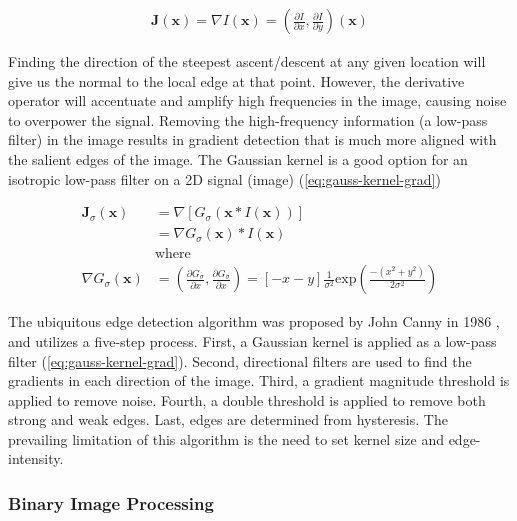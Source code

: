 \begin{equation}
    \begin{aligned}
        \mathbf{J}(\mathbf{x}) = \nabla I(\mathbf{x}) = (\frac{\partial I}{\partial x}, \frac{\partial I}{\partial y})(\mathbf{x})
    \end{aligned}
    \label{eq:img-grad}
\end{equation}

Finding the direction of the steepest ascent/descent at any given location will give us the normal to the local edge at that point. However, the derivative operator will accentuate and amplify high frequencies in the image, causing noise to overpower the signal. Removing the high-frequency information (a low-pass filter) in the image results in gradient detection that is much more aligned with the salient edges of the image. The Gaussian kernel is a good option for an isotropic low-pass filter on a 2D signal (image) (\cref{eq:gauss-kernel-grad})

\begin{equation}
    \begin{aligned}
        \mathbf{J}_{\sigma}(\mathbf{x}) &= \nabla [G_\sigma (\mathbf{x} * I(\mathbf{x}))] \\
        &= \nabla G_\sigma (\mathbf{x}) * I(\mathbf{x}) \\
        &\text{where} \\
        \nabla G_\sigma (\mathbf{x}) &= (\frac{\partial G_{\sigma}}{\partial x}, \frac{\partial G_{\sigma}}{\partial x}) = [-x - y]\frac{1}{\sigma^{2}}\text{exp}(\frac{-(x^2 + y^2)}{2 \sigma^2})
    \end{aligned}
    \label{eq:gauss-kernel-grad}
\end{equation}


The ubiquitous edge detection algorithm was proposed by John Canny in 1986 \cite{cannyComputationalApproachEdge1986}, and utilizes a five-step process. First, a Gaussian kernel is applied as a low-pass filter (\cref{eq:gauss-kernel-grad}). Second, directional filters are used to find the gradients in each direction of the image. Third, a gradient magnitude threshold is applied to remove noise. Fourth, a double threshold is applied to remove both strong and weak edges. Last, edges are determined from hysteresis. The prevailing limitation of this algorithm is the need to set kernel size and edge-intensity.

\subsubsection{Binary Image Processing}
\label{sec:binary-img-proc}

